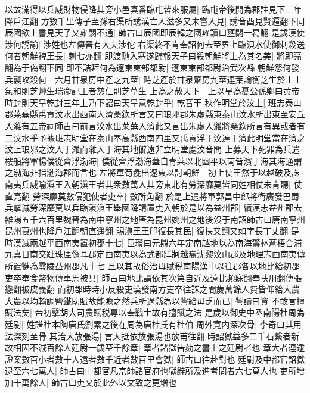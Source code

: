 以故滿得以兵威財物侵降其旁小邑真番臨屯皆來服屬|{
	臨屯帝後開為郡註見下三年降戶江翻}
方數千里傳子至孫右渠所誘漢亡人滋多又未嘗入見|{
	誘音酉見賢遍翻下同}
辰國欲上書見天子又雍閼不通|{
	師古曰辰國即辰韓之國雍讀曰壅閼一曷翻}
是歲漢使涉何誘諭|{
	涉姓也左傳晉有大夫涉佗}
右渠終不肯奉詔何去至界上臨浿水使御刺殺送何者朝鮮裨王長|{
	刺七亦翻}
即渡馳入塞遂歸報天子曰殺朝鮮將上為其名美|{
	將即亮翻為于偽翻下同}
即不詰拜何為遼東東部都尉|{
	遼東東部都尉治武次縣}
朝鮮怨何發兵襲攻殺何　六月甘泉房中產芝九莖|{
	時芝產於甘泉齋房九莖連葉論衡芝生於土土氣和則芝艸生瑞命記王者慈仁則芝草生}
上為之赦天下　上以旱為憂公孫卿曰黄帝時封則天旱乾封三年上乃下詔曰天旱意乾封乎|{
	乾音干}
秋作明堂於汶上|{
	班志泰山郡莱蕪縣禹貢汶水出西南入濟桑欽所言又曰琅邪郡朱虛縣東泰山汶水所出東至安丘入濰有五帝祠師古曰前言汶水出莱蕪入濟此又言出朱虚入濰將桑欽所言有異或者有二汶水乎予據班志明堂在泰山奉高縣西南四里又禹貢浮于汶達于濟此明堂當在濟之汶上琅邪之汶入于濰而濰入于海其地僻遠非立明堂處汶音問}
上募天下死罪為兵遣樓船將軍楊僕從齊浮渤海|{
	僕從齊浮渤海蓋自青莱以北幽平以南皆濱于海其海通謂之渤海非指渤海郡而言也}
左將軍荀彘出遼東以討朝鮮　初上使王然于以越破及誅南夷兵威喻滇王入朝滇王者其衆數萬人其旁東北有勞深靡莫皆同姓相仗未肯聽|{
	仗直亮翻}
勞深靡莫數侵犯使者吏卒|{
	數所角翻}
於是上遣將軍郭昌中郎將衛廣發巴蜀兵擊滅勞深靡莫以兵臨滇滇王舉國降請置吏入朝於是以為益州郡|{
	續漢志益州郡去雒陽五千六百里魏晉為南中寧州之地唐為昆州姚州之地後沒于南詔師古曰唐南寧州昆州裒州也降戶江翻朝直遥翻}
賜滇王王印復長其民|{
	復扶又翻又如字長丁丈翻}
是時漢滅兩越平西南夷置初郡十七|{
	臣瓚曰元鼎六年定南越地以為南海欝林蒼梧合浦九真日南交趾珠厓儋耳郡定西南夷以為武都牂牁越巂沈黎汶山郡及地理志西南夷傳所置犍為零陵益州郡凡十七}
且以其故俗治毋賦税南陽漢中以往郡各以地比給初郡吏卒奉食幣物傳車馬被具|{
	師古曰地比謂依其次第自近及遠比頻寐翻奉扶用翻傳張戀翻被皮義翻}
而初郡時時小反殺吏漢發南方吏卒往誅之間歲萬餘人費皆仰給大農大農以均輸調鹽鐵助賦故能贍之然兵所過縣為以訾給毋乏而已|{
	訾讀曰資}
不敢言擅賦法矣|{
	帝初擊胡大司農賦税專以奉戰士故有擅賦之法}
是歲以御史中丞南陽杜周為廷尉|{
	姓譜杜本陶唐氏劉累之後在周為唐杜氏有杜伯}
周外寛内深次骨|{
	李奇曰其用法深刻至骨}
其治大放張湯|{
	言大抵依放張湯也放甫往翻}
時詔獄益多二千石繫者新故相因不減百餘人廷尉一歲至千餘章|{
	章者諸獄告劾之書上之廷尉者也}
章大者連逮證案數百小者數十人遠者數千近者數百里會獄|{
	師古曰往赴對也}
廷尉及中都官詔獄逮至六七萬人|{
	師古曰中都官凡京師諸官府也獄辭所及進考問者六七萬人也}
吏所增加十萬餘人|{
	師古曰吏又於此外以文致之更增也}


